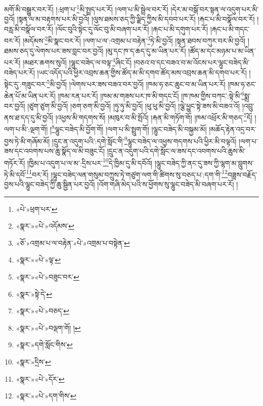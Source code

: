 མགོ་མི་བསྒྱུར་བར་རོ། །:ཕྲག་པ་\footnote{«པེ་»ཕྲག་པར་}མི་སྤྲད་པར་རོ། །ལག་པ་མི་སྦྲེལ་བར་རོ། །དེར་མ་བསྒོ་བར་སྟན་ལ་འདུག་པར་མི་བྱའོ། །སྟན་ལ་མ་བརྟགས་པར་མི་བྱའོ། །ལུས་ཐམས་ཅད་ཀྱི་ལྗིད་ཀྱིས་མི་དབབ་པར་རོ། །རྐང་པ་མི་བསྣོལ་བར་རོ། །བརླ་མི་བསྣོལ་བར་རོ། །ལོང་བུའི་སྟེང་དུ་ལོང་བུ་མི་བཞག་པར་རོ། །རྐང་པ་མི་དགུག་པར་རོ། །རྐང་པ་མི་གདང་བར་རོ། །མདོམས་\footnote{«སྣར་»«པེ་»འདོམས་}མི་སྣང་བར་རོ། །ལག་པ་ལ་:འགྲམ་པ་བརྟེན་\footnote{«ཅོ་»འགྲམ་པ་ལ་བརྟེན་«པེ་»འགྲམ་པ་བསྟེན་}ཏེ་མི་བྱའོ། །སྟན་ཐབས་བཀུར་བར་མི་བྱའོ། །ཐམས་ཅད་དུ་ལེགས་པར་ཟས་བླང་བར་བྱའོ། །མུ་དང་ཁ་ད་ཆད་དུ་མ་ཡིན་པར་རོ། །ཚོད་མ་དང་མཉམ་པ་མ་ཡིན་པར་རོ། །མཐར་ཆགས་སུའོ། །ལྷུང་བཟེད་ལ་བལྟ་\footnote{«སྣར་»«པེ་»ལྟ་}ཞིང་ངོ། །བཅའ་བ་དང་བཟའ་བ་མ་འོངས་པར་ལྷུང་བཟེད་མི་བཟེད་པར་རོ། །ཡང་འདོད་པའི་ཕྱིར་འབྲས་ཆན་གྱིས་ཚོད་མ་མི་དགབ་ཚོད་མས་འབྲས་ཆན་མི་དགབ་པར་རོ། །སྟེང་དུ་:གཟུང་བར་\footnote{«སྣར་»«པེ་»བཟུང་བར་}མི་བྱའོ། །ལེགས་པར་ཟས་བཟའ་བར་བྱའོ། །ཁམ་ཧ་ཅང་ཆུང་བ་མ་ཡིན་པར་རོ། །ཁམ་ཧ་ཅང་ཆེན་པོ་མ་ཡིན་པར་རོ། །ཁམ་རན་པར་རོ། །ཁམ་མ་གཟས་པར་ཁ་མི་གདང་ངོ། །ཁ་ཁམ་གྱིས་བཀང་:སྟེ་མི་\footnote{«སྣར་»སྟེ་དེ་}སྨྲ་བར་བྱའོ། །ཙུག་ཙུག་མི་བྱའོ། །ཅག་ཅག་མི་བྱའོ། །ཧུ་ཧུ་མི་བྱའོ། །ཕུ་ཕུ་མི་བྱའོ། །ལྕེ་ཕྱུང་སྟེ་ཟས་མི་བཟའ་འོ། །འབྲུ་ནས་ཐ་དད་དུ་མི་བྱའོ། །འཕྱས་མི་གདགས་སོ། །མཁུར་བ་མི་སྤོའོ། །རྐན་མི་གཏོག་གོ། །ཁམ་འཕྲོར་མི་གཅད་\footnote{«སྣར་»«པེ་»བཅད་}དོ། །ལག་པ་མི་:ལྡག་གོ། །\footnote{«སྣར་»«པེ་»བལྡག་གོ། །}ལྷུང་བཟེད་མི་བྱོག་གོ། །ལག་པ་མི་སྤྲུག་གོ། །ལྷུང་བཟེད་མི་བསྐྱམ་མོ། །མཆོད་རྟེན་འདྲ་བར་བྱས་ཏེ་མི་གཞོམ་མོ། །དྲུང་ན་འདུག་པའི་:དགེ་སློང་གི་\footnote{«སྣར་»དགེ་སློང་གིས་}ལྷུང་བཟེད་ལ་འཕྱས་གདགས་པའི་ཕྱིར་མི་བལྟའོ། །ལག་པ་ཟས་དང་འབགས་པས་ཆུ་སྣོད་ལ་མི་བཟུང་ངོ། །དྲུང་ན་འདུག་པའི་དགེ་སློང་ལ་ཟས་དང་འབགས་པའི་ཆུས་མི་གཏོར་རོ། །ཁྱིམ་པ་འདུག་པ་ལ་མ་:དྲིས་པར་\footnote{«སྣར་»དྲིས་}དེ་ཁྱིམ་དུ་མི་དབོའོ། །ལྷུང་བཟེད་ཀྱི་ནང་དུ་ཟས་ཀྱི་ལྷག་མ་བླུགས་ཏེ་མི་དབོ་\footnote{«སྣར་»«པེ་»དོར་}བར་རོ། །ལྷུང་བཟེད་ལན་གསུམ་བཀྲུས་ཏེ་གཙུག་ལག་གི་ཚིགས་སུ་བཅད་པ་:དག་གི་\footnote{«སྣར་»«པེ་»དག་གིས་}བཟླས་བརྗོད་བྱས་པའི་ལྷུང་བཟེད་ཀྱི་ཆུ་སྦྱིན་པར་བྱའོ། །འོག་གཞི་མེད་པའི་ས་ཕྱོགས་སུ་ལྷུང་བཟེད་མི་བཞག་པར་རོ། །
